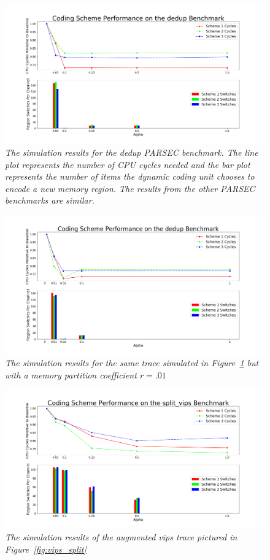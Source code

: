 \begin{figure}[htbp]
		\includegraphics[width=\linewidth]{fig/dedup_benchmark_results.png}
		\caption{\it{The simulation results for the dedup PARSEC benchmark. The line plot represents the number of CPU cycles needed and the bar plot represents the number of items the dynamic coding unit chooses to encode a new memory region. The results from the other PARSEC benchmarks are similar.}}
		\label{fig:dedup_results}
\end{figure}

\begin{figure}[htbp]
		\includegraphics[width=\linewidth]{fig/dedup_hundreth.png}
		\caption{\it{The simulation results for the same trace simulated in Figure~\ref{fig:dedup_results} but with a memory partition coefficient $r = .01$}}
		\label{fig:dedup_hundreth}
\end{figure}

\begin{figure}[htbp]
		\includegraphics[width=\linewidth]{fig/vips_split_results.png}
		\caption{\it{The simulation results of the augmented vips trace pictured in Figure~\ref{fig:vips_split}}}
		\label{fig:vips_split_result}
\end{figure}

